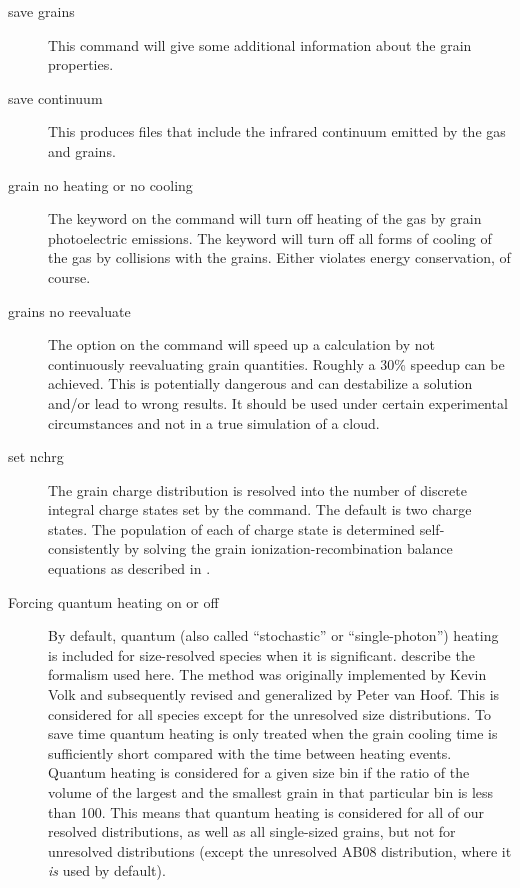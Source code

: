 \begin{description}
\item[save grains] 
This command will give
some additional information about the grain properties.

\item[save continuum]
This produces files that include the infrared
continuum emitted by the gas and grains.

\item[grain no heating or no cooling]  The keyword
 on the 
command will turn off heating of the gas by grain photoelectric emissions.
The keyword  will turn off all forms of cooling of the gas by
collisions with the grains.
Either violates energy conservation, of course.

\item[grains no reevaluate]  The  option
on the
 command
will speed up a calculation by not continuously reevaluating grain
quantities.
Roughly a 30\% speedup can be achieved.
This is potentially
dangerous and can destabilize a solution and/or lead to wrong results.
It should be used under certain experimental circumstances and
not in a true simulation of a cloud.

\item[set nchrg]  The grain charge distribution is resolved
into the number
of discrete integral charge states set by the  command.
The default is two charge states.
The population of each of charge state is determined
self-consistently by solving the grain ionization-recombination
balance equations as described in \citet{VanHoof2004}.

\item[Forcing quantum heating on or off]  
By default,
quantum (also called ``stochastic'' or ``single-photon'') heating
is included for size-resolved
species when it is significant.
\citet{Guhathakurta1989} describe
the formalism used here.
The method was originally implemented by Kevin
Volk and subsequently revised and generalized by Peter van Hoof.
This is
considered for all species except for the unresolved size distributions.
To save time quantum heating is only treated when the grain cooling time
is sufficiently short compared with the time between heating events.  Quantum
heating is considered for a given size bin if the ratio of the volume of
the largest and the smallest grain in that particular bin is less than 100.
This means that quantum heating is considered for all of our resolved
distributions, as well as all single-sized grains,
but not for unresolved
distributions (except the unresolved AB08 distribution, where it
\emph{is} used by default).


\end{description}
